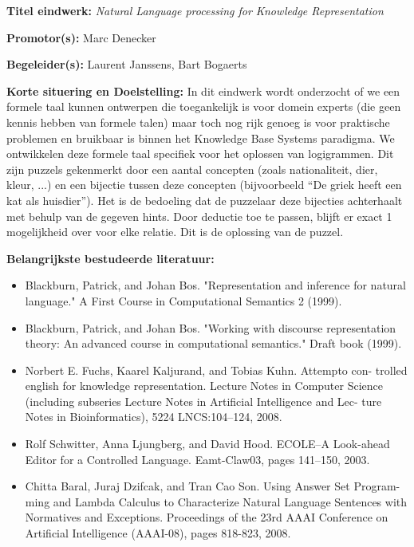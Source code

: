 \documentclass[12pt]{report}
\begin{document}
\pagestyle{myheadings}
{\bf Titel eindwerk:} {\em Natural Language processing for Knowledge Representation}

\vspace{0.5cm}
{\bf Promotor(s):} Marc Denecker


\vspace{0.5cm}
{\bf Begeleider(s):} Laurent Janssens, Bart Bogaerts

\vspace{1cm}
{\bf Korte situering en Doelstelling: } In dit eindwerk wordt onderzocht of we een formele taal kunnen ontwerpen die toegankelijk is voor domein experts (die geen kennis hebben van formele talen) maar toch nog rijk genoeg is voor praktische problemen en bruikbaar is binnen het Knowledge Base Systems paradigma. We ontwikkelen deze formele taal specifiek voor het oplossen van logigrammen. Dit zijn puzzels gekenmerkt door een aantal concepten (zoals nationaliteit, dier, kleur, ...) en een bijectie tussen deze concepten (bijvoorbeeld ``De griek heeft een kat als huisdier''). Het is de bedoeling dat de puzzelaar deze bijecties achterhaalt met behulp van de gegeven hints. Door deductie toe te passen, blijft er exact 1 mogelijkheid over voor elke relatie. Dit is de oplossing van de puzzel.

\vspace{1cm}
{\bf Belangrijkste bestudeerde literatuur:}
\begin{itemize}
  \item Blackburn, Patrick, and Johan Bos. "Representation and inference for natural language." A First Course in Computational Semantics 2 (1999).
  \item Blackburn, Patrick, and Johan Bos. "Working with discourse representation theory: An advanced course in computational semantics." Draft book (1999).
  \item Norbert E. Fuchs, Kaarel Kaljurand, and Tobias Kuhn. Attempto con- trolled english for knowledge representation. Lecture Notes in Computer Science (including subseries Lecture Notes in Artificial Intelligence and Lec- ture Notes in Bioinformatics), 5224 LNCS:104–124, 2008.
  \item Rolf Schwitter, Anna Ljungberg, and David Hood. ECOLE–A Look-ahead Editor for a Controlled Language. Eamt-Claw03, pages 141–150, 2003.
  \item Chitta Baral, Juraj Dzifcak, and Tran Cao Son. Using Answer Set Program- ming and Lambda Calculus to Characterize Natural Language Sentences with Normatives and Exceptions. Proceedings of the 23rd AAAI Conference on Artificial Intelligence (AAAI-08), pages 818-823, 2008.
\end{itemize}
\end{document}
